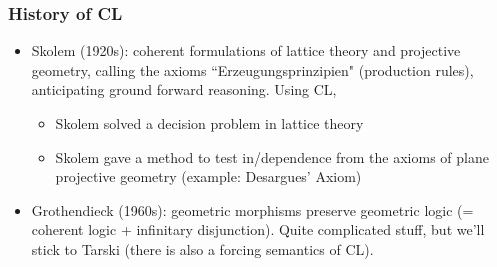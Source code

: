 \documentclass[handout,11pt,hyperref ={colorlinks = true, urlcolor = red}]{beamer}
\begin{document}
\begin{frame}
\frametitle{History of CL}
 \begin{itemize}[<+->]   %
    \item Skolem (1920s): coherent formulations of lattice theory 
    and projective geometry, calling the axioms ``Erzeugungsprinzipien"
    (production rules), anticipating ground forward reasoning. Using CL,
    \begin{itemize}[<+->]   %
    \item Skolem solved a decision problem in lattice theory
    \item Skolem gave a method to test in/dependence from the axioms
    of plane projective geometry (example: Desargues' Axiom)
    \end{itemize}
    
    \item Grothendieck (1960s): geometric morphisms preserve geometric
              logic (= coherent logic + infinitary disjunction).
    Quite complicated stuff, but we'll stick to Tarski
    (there is also a forcing semantics of CL).
 \end{itemize}
\end{frame}
\end{document}
